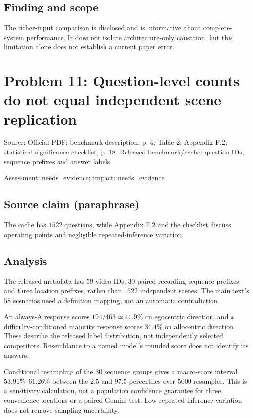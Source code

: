 \documentclass[11pt]{article}
\begin{document}
\subsection*{Finding and scope}

The richer-input comparison is disclosed and is informative about complete-system performance. It does not isolate architecture-only causation, but this limitation alone does not establish a current paper error.

\section*{Problem 11: Question-level counts do not equal independent scene replication}

Source: Official PDF: benchmark description, p. 4; Table 2; Appendix F.2; statistical-significance checklist, p. 18. Released benchmark/cache: question IDs, sequence prefixes and answer labels.

Assessment: needs\_evidence; impact: needs\_evidence

\subsection*{Source claim (paraphrase)}

The cache has \(1522\) questions, while Appendix F.2 and the checklist discuss operating points and negligible repeated-inference variation.

\subsection*{Analysis}

The released metadata has \(59\) video IDs, \(30\) paired recording-sequence prefixes and three location prefixes, rather than \(1522\) independent scenes. The main text's \(58\) scenarios need a definition mapping, not an automatic contradiction.

An always-A response scores \(194/463\simeq41.9\%\) on egocentric direction, and a difficulty-conditioned majority response scores \(34.4\%\) on allocentric direction. These describe the released label distribution, not independently selected competitors. Resemblance to a named model's rounded score does not identify its answers.

Conditional resampling of the \(30\) sequence groups gives a macro-score interval \(53.91\%\)–\(61.26\%\) between the \(2.5\) and \(97.5\) percentiles over \(5000\) resamples. This is a sensitivity calculation, not a population confidence guarantee for three convenience locations or a paired Gemini test. Low repeated-inference variation does not remove sampling uncertainty.
\end{document}
